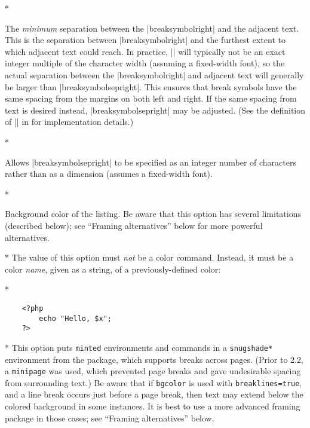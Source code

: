 \begin{paracol}{2}
\begin{optionlist}
\switchcolumn

\switchcolumn[0]*%
\item[breaksymbolsepright (dimension) (\meta{breaksymbolseprightnchars})]
The \emph{minimum} separation between the |breaksymbolright| and the adjacent text.  This is the separation between |breaksymbolright| and the furthest extent to which adjacent text could reach.  In practice, |\linewidth| will typically not be an exact integer multiple of the character width (assuming a fixed-width font), so the actual separation between the |breaksymbolright| and adjacent text will generally be larger than |breaksymbolsepright|.  This ensures that break symbols have the same spacing from the margins on both left and right.  If the same spacing from text is desired instead, |breaksymbolsepright| may be adjusted.  (See the definition of |\FV@makeLineNumber| in  for implementation details.)
\switchcolumn

\switchcolumn[0]*%
\item[breaksymbolseprightnchars (integer) (2)]
Allows |breaksymbolsepright| to be specified as an integer number of characters rather than as a dimension (assumes a fixed-width font).
\switchcolumn

\switchcolumn[0]*%

  \item[bgcolor (string) (\meta{none})]
    Background color of the listing.  Be aware that this option has several limitations (described below); see ``Framing alternatives'' below for more powerful alternatives.
    \switchcolumn

    \switchcolumn[0]*%
    The value of this option must \emph{not} be a color command. Instead, it must be a color \emph{name}, given as a string, of a previously-defined color:
    \switchcolumn

    \switchcolumn[0]*%
\begin{example}
    \begin{verbatim}
    <?php
        echo "Hello, $x";
    ?>
    \end{verbatim}
\end{example}
\switchcolumn

\switchcolumn[0]*%
This option puts \texttt{minted} environments and \texttt{\string\mint} commands in a \texttt{snugshade*} environment from the  package, which supports breaks across pages.  (Prior to  2.2, a \texttt{minipage} was used, which prevented page breaks and gave undesirable spacing from surrounding text.)  Be aware that if \texttt{bgcolor} is used with \texttt{breaklines=true}, and a line break occurs just before a page break, then text may extend below the colored background in some instances.  It is best to use a more advanced framing package in those cases; see ``Framing alternatives'' below.
\switchcolumn


\end{optionlist}
\end{paracol}
